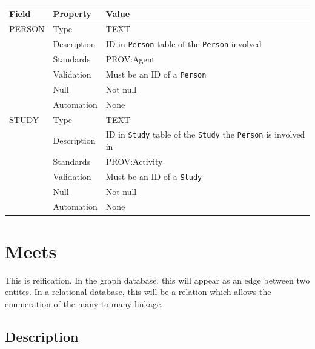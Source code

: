 \documentclass[
]{article}
\newcounter{none}
\begin{document}
{\def\LTcaptype{none} 
\begin{longtable}[]{@{}
  >{\raggedright\arraybackslash}p{}
  >{\raggedright\arraybackslash}p{}
  >{\raggedright\arraybackslash}p{}@{}}
\toprule\noalign{}
\begin{minipage}[b]{\linewidth}\raggedright
Field
\end{minipage} & \begin{minipage}[b]{\linewidth}\raggedright
Property
\end{minipage} & \begin{minipage}[b]{\linewidth}\raggedright
Value
\end{minipage} \\
\midrule\noalign{}
\endhead
\bottomrule\noalign{}
\endlastfoot
PERSON & Type & TEXT \\
& Description & ID in \texttt{Person} table of the \texttt{Person}
involved \\
& Standards & PROV:Agent \\
& Validation & Must be an ID of a \texttt{Person} \\
& Null & Not null \\
& Automation & None \\
STUDY & Type & TEXT \\
& Description & ID in \texttt{Study} table of the \texttt{Study} the
\texttt{Person} is involved in \\
& Standards & PROV:Activity \\
& Validation & Must be an ID of a \texttt{Study} \\
& Null & Not null \\
& Automation & None \\
\end{longtable}
}

\section{Meets}\label{meets}

This is reification. In the graph database, this will appear as an edge
between two entites. In a relational database, this will be a relation
which allows the enumeration of the many-to-many linkage.

\subsection{Description}\label{description-17}
\end{document}
